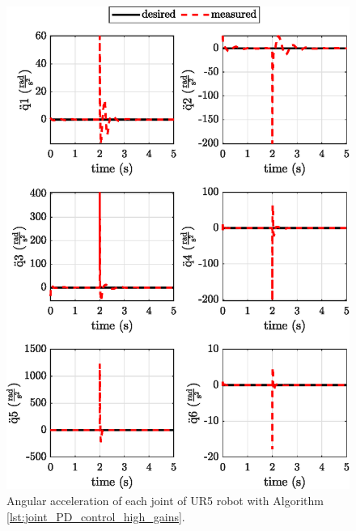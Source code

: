 \begin{figure}
    \centering
    \includegraphics{images/act_1.4/joint_acceleration.eps}
    \caption{Angular acceleration of each joint of UR5 robot with Algorithm \ref{lst:joint_PD_control_high_gains}.}
    \label{fig:act_1.4_joint_acceleration}
\end{figure}